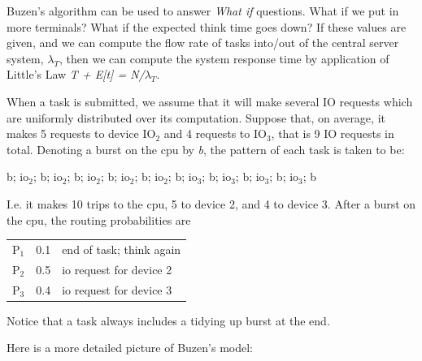 \documentclass[12pt,fleqn]{report}
\begin{document}
Buzen's algorithm can be used to  answer {\it What if} questions.
What if we put in more terminals?
What if the expected think time goes down?
If these values are given, and we can compute the 
flow rate of tasks into/out of the central server system, $\lambda_T$,
then we can compute the system response time
by application of Little's Law {\it T + E[t] = N/$\lambda_T$}.

When a task is submitted, we assume that it will
make several IO requests which are uniformly
distributed over its computation. Suppose that, on average,
it makes 5 requests to device IO$_2$ and 4 requests to IO$_3$,
that is 9 IO requests in total.
Denoting a burst on the cpu by {\it b}, the pattern of each task is
taken to be:

\begin{center}
b; io$_2$; b; io$_2$; b; io$_2$; b; io$_2$; b; io$_2$;
b; io$_3$; b; io$_3$; b; io$_3$; b; io$_3$; b
\end{center}

\noindent
I.e. it makes 10 trips to the cpu, 5 to device 2, and 4 to device 3.
After a burst on the cpu, the
routing probabilities are

\begin{center}
\begin{tabular}{l c l}
P$_1$ & 0.1 & end of task; think again \\
P$_2$ & 0.5 & io request for device 2\\
P$_3$ & 0.4 & io request for device 3
\end{tabular}
\end{center}

\noindent
Notice that a task always includes a tidying up burst at the end.

Here is a more detailed picture of Buzen's model:
\end{document}
